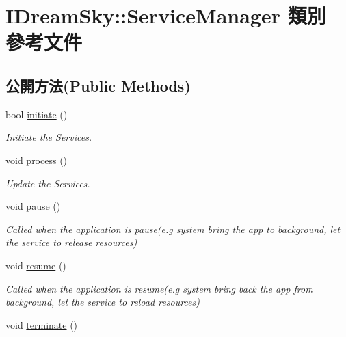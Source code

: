 \hypertarget{class_i_dream_sky_1_1_service_manager}{}\section{I\+Dream\+Sky\+:\+:Service\+Manager 類別 參考文件}
\label{class_i_dream_sky_1_1_service_manager}
\subsection*{公開方法(Public Methods)}
\begin{DoxyCompactItemize}
\item 
bool \hyperlink{class_i_dream_sky_1_1_service_manager_a89840c485df0010566caa1d88ea7fc47}{initiate} ()
\begin{DoxyCompactList}\small\item\em Initiate the Services. \end{DoxyCompactList}\item 
void \hyperlink{class_i_dream_sky_1_1_service_manager_abcda82b9840798732a6fb299277532b3}{process} ()\hypertarget{class_i_dream_sky_1_1_service_manager_abcda82b9840798732a6fb299277532b3}{}\label{class_i_dream_sky_1_1_service_manager_abcda82b9840798732a6fb299277532b3}

\begin{DoxyCompactList}\small\item\em Update the Services. \end{DoxyCompactList}\item 
void \hyperlink{class_i_dream_sky_1_1_service_manager_a80893d8810a8c1e2846cde352997c747}{pause} ()\hypertarget{class_i_dream_sky_1_1_service_manager_a80893d8810a8c1e2846cde352997c747}{}\label{class_i_dream_sky_1_1_service_manager_a80893d8810a8c1e2846cde352997c747}

\begin{DoxyCompactList}\small\item\em Called when the application is pause(e.\+g system bring the app to background, let the service to release resources) \end{DoxyCompactList}\item 
void \hyperlink{class_i_dream_sky_1_1_service_manager_a1d3b0b448735facafbc60a5e3676ac23}{resume} ()\hypertarget{class_i_dream_sky_1_1_service_manager_a1d3b0b448735facafbc60a5e3676ac23}{}\label{class_i_dream_sky_1_1_service_manager_a1d3b0b448735facafbc60a5e3676ac23}

\begin{DoxyCompactList}\small\item\em Called when the application is resume(e.\+g system bring back the app from background, let the service to reload resources) \end{DoxyCompactList}\item 
void \hyperlink{class_i_dream_sky_1_1_service_manager_a2751316a691709f1fd94ddda9c31748c}{terminate} ()\hypertarget{class_i_dream_sky_1_1_service_manager_a2751316a691709f1fd94ddda9c31748c}{}\label{class_i_dream_sky_1_1_service_manager_a2751316a691709f1fd94ddda9c31748c}


\end{DoxyCompactItemize}
